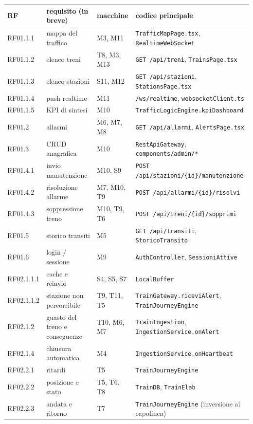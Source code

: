 \documentclass[11pt]{article}
\begin{document}
\begin{center}
\begin{tabular}{llll}
RF & requisito (in breve) & macchine & codice principale\\
\hline
RF01.1.1 & mappa del traffico & M3, M11 & \texttt{TrafficMapPage.tsx}, \texttt{RealtimeWebSocket}\\
RF01.1.2 & elenco treni & T8, M3, M13 & \texttt{GET /api/treni}, \texttt{TrainsPage.tsx}\\
RF01.1.3 & elenco stazioni & S11, M12 & \texttt{GET /api/stazioni}, \texttt{StationsPage.tsx}\\
RF01.1.4 & push realtime & M11 & \texttt{/ws/realtime}, \texttt{websocketClient.ts}\\
RF01.1.5 & KPI di sintesi & M10 & \texttt{TrafficLogicEngine.kpiDashboard}\\
RF01.2 & allarmi & M6, M7, M8 & \texttt{GET /api/allarmi}, \texttt{AlertsPage.tsx}\\
RF01.3 & CRUD anagrafica & M10 & \texttt{RestApiGateway}, \texttt{components/admin/*}\\
RF01.4.1 & invio manutenzione & M10, S9 & \texttt{POST /api/stazioni/\{id\}/manutenzione}\\
RF01.4.2 & risoluzione allarme & M7, M10, T9 & \texttt{POST /api/allarmi/\{id\}/risolvi}\\
RF01.4.3 & soppressione treno & M10, T9, T6 & \texttt{POST /api/treni/\{id\}/sopprimi}\\
RF01.5 & storico transiti & M5 & \texttt{GET /api/transiti}, \texttt{StoricoTransito}\\
RF01.6 & login / sessione & M9 & \texttt{AuthController}, \texttt{SessioniAttive}\\
RF02.1.1.1 & cache e reinvio & S4, S5, S7 & \texttt{LocalBuffer}\\
RF02.1.1.2 & stazione non percorribile & T9, T11, T5 & \texttt{TrainGateway.riceviAlert}, \texttt{TrainJourneyEngine}\\
RF02.1.2 & guasto del treno e conseguenze & T10, M6, M7 & \texttt{TrainIngestion}, \texttt{IngestionService.onAlert}\\
RF02.1.4 & chiusura automatica & M4 & \texttt{IngestionService.onHeartbeat}\\
RF02.2.1 & ritardi & T5 & \texttt{TrainJourneyEngine}\\
RF02.2.2 & posizione e stato & T5, T6, T8 & \texttt{TrainDB}, \texttt{TrainElab}\\
RF02.2.3 & andata e ritorno & T7 & \texttt{TrainJourneyEngine} (inversione al capolinea)\\

\end{tabular}
\end{center}
\end{document}
